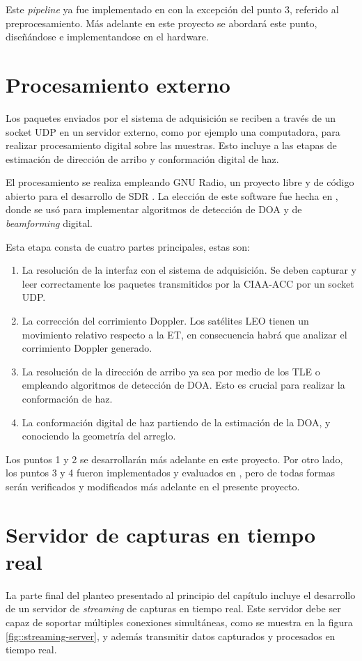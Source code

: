 \documentclass[../../main.tex]{subfiles}
\begin{document}
Este \textit{pipeline} ya fue implementado en \cite{proyecto-jose} con la excepción del punto 3, referido al preprocesamiento. Más adelante en este proyecto se abordará este punto, diseñándose e implementandose en el hardware.


\section{Procesamiento externo}
Los paquetes enviados por el sistema de adquisición se reciben a través de un socket UDP en un servidor externo, como por ejemplo una computadora, para realizar procesamiento digital sobre las muestras. Esto incluye a las etapas de estimación de dirección de arribo y conformación digital de haz.

El procesamiento se realiza empleando GNU Radio, un proyecto libre y de código abierto para el desarrollo de SDR \cite{GNURadio}. La elección de este software fue hecha en \cite{proyecto-grigo}, donde se usó para implementar algoritmos de detección de DOA y de \textit{beamforming} digital.

Esta etapa consta de cuatro partes principales, estas son:
\begin{enumerate}
    \item La resolución de la interfaz con el sistema de adquisición. Se deben capturar y leer correctamente los paquetes transmitidos por la CIAA-ACC por un socket UDP.
    \item La corrección del corrimiento Doppler. Los satélites LEO tienen un movimiento relativo respecto a la ET, en consecuencia habrá que analizar el corrimiento Doppler generado.
    \item La resolución de la dirección de arribo ya sea por medio de los TLE o empleando algoritmos de detección de DOA. Esto es crucial para realizar la conformación de haz.
    \item La conformación digital de haz partiendo de la estimación de la DOA, y conociendo la geometría del arreglo.
\end{enumerate}

Los puntos 1 y 2 se desarrollarán más adelante en este proyecto. Por otro lado, los puntos 3 y 4 fueron implementados y evaluados en \cite{proyecto-grigo}, pero de todas formas serán verificados y modificados más adelante en el presente proyecto.

\section{Servidor de capturas en tiempo real}
La parte final del planteo presentado al principio del capítulo incluye el desarrollo de un servidor de \textit{streaming} de capturas en tiempo real. Este servidor debe ser capaz de soportar múltiples conexiones simultáneas, como se muestra en la figura \ref{fig::streaming-server}, y además transmitir datos capturados y procesados en tiempo real. 

\end{document}
